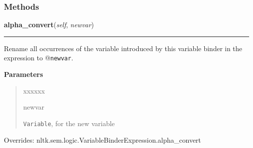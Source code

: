   \subsubsection{Methods}

    \vspace{0.5ex}

\hspace{.8\funcindent}\begin{boxedminipage}{\funcwidth}

    \raggedright \textbf{alpha\_convert}(\textit{self}, \textit{newvar})

    \vspace{-1.5ex}

    \rule{\textwidth}{0.5\fboxrule}
\setlength{\parskip}{2ex}
    Rename all occurrences of the variable introduced by this variable 
    binder in the expression to @\texttt{newvar}.

\setlength{\parskip}{1ex}
      \textbf{Parameters}
      \vspace{-1ex}

      \begin{quote}
        \begin{Ventry}{xxxxxx}

          \item[newvar]

          \texttt{Variable}, for the new variable

        \end{Ventry}

      \end{quote}

      Overrides: nltk.sem.logic.VariableBinderExpression.alpha\_convert

    \end{boxedminipage}

    \vspace{0.5ex}

